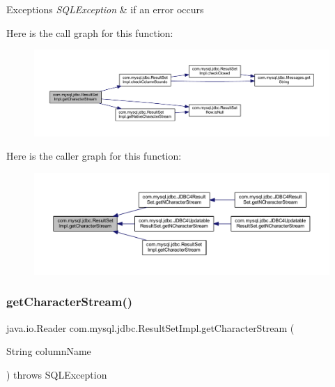 \begin{DoxyExceptions}{Exceptions}
{\em S\+Q\+L\+Exception} & if an error occurs \\
\hline
\end{DoxyExceptions}
Here is the call graph for this function\+:
\nopagebreak
\begin{figure}[H]
\begin{center}
\leavevmode
\includegraphics[width=350pt]{classcom_1_1mysql_1_1jdbc_1_1_result_set_impl_a941ea1683438a62fca25a1553e10e6e4_cgraph}
\end{center}
\end{figure}
Here is the caller graph for this function\+:
\nopagebreak
\begin{figure}[H]
\begin{center}
\leavevmode
\includegraphics[width=350pt]{classcom_1_1mysql_1_1jdbc_1_1_result_set_impl_a941ea1683438a62fca25a1553e10e6e4_icgraph}
\end{center}
\end{figure}
\mbox{\label{classcom_1_1mysql_1_1jdbc_1_1_result_set_impl_aba214197b5cf31aa7baee241a2ce91a2}} 
\subsubsection{\texorpdfstring{get\+Character\+Stream()}{getCharacterStream()}\hspace{0.1cm}{\footnotesize\ttfamily [2/2]}}
{\footnotesize\ttfamily java.\+io.\+Reader com.\+mysql.\+jdbc.\+Result\+Set\+Impl.\+get\+Character\+Stream (\begin{DoxyParamCaption}\item[{String}]{column\+Name }\end{DoxyParamCaption}) throws S\+Q\+L\+Exception}

